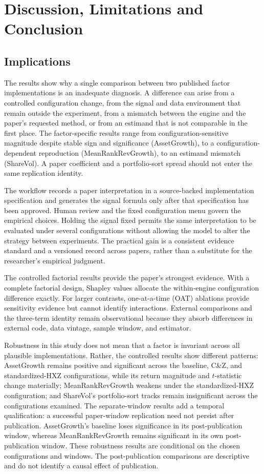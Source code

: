 \section{Discussion, Limitations and Conclusion}
\label{sec:discussion}

\subsection{Implications}

The results show why a single comparison between two published factor
implementations is an inadequate diagnosis. A difference can arise from a
controlled configuration change, from the signal and data environment that
remain outside the experiment, from a mismatch between the engine and the
paper's requested method, or from an estimand that is not comparable in the
first place. The factor-specific results range from configuration-sensitive
magnitude despite stable sign and significance (AssetGrowth), to a
configuration-dependent reproduction (MeanRankRevGrowth), to an estimand
mismatch (ShareVol). A paper coefficient and a portfolio-sort spread should
not enter the same replication identity.

The workflow records a paper interpretation in a source-backed
implementation specification and generates the signal formula only after that
specification has been approved. Human review and the fixed configuration menu
govern the empirical choices. Holding the signal fixed permits the same
interpretation to be evaluated under several configurations without allowing
the model to alter the strategy between experiments. The practical gain is a
consistent evidence standard and a versioned record across papers, rather than
a substitute for the researcher's empirical judgment.

The controlled factorial results provide the paper's strongest evidence.
With a complete factorial design, Shapley values allocate the within-engine
configuration difference exactly. For larger contrasts, one-at-a-time (OAT)
ablations provide sensitivity evidence but cannot identify interactions.
External comparisons and the three-term identity remain observational because
they absorb differences in external code, data vintage, sample window, and
estimator.

Robustness in this study does not mean that a factor is invariant across all
plausible implementations. Rather, the controlled results show different
patterns: AssetGrowth remains positive and significant across the baseline,
C\&Z, and standardized-HXZ configurations, while its return magnitude and
$t$-statistic change materially; MeanRankRevGrowth weakens under the
standardized-HXZ configuration; and ShareVol's portfolio-sort tracks remain
insignificant across the configurations examined. The separate-window results
add a temporal qualification: a successful paper-window replication need not
persist after publication. AssetGrowth's baseline loses significance in its
post-publication window, whereas MeanRankRevGrowth remains significant in its
own post-publication window. These robustness results are conditional on the
chosen configurations and windows. The post-publication comparisons are
descriptive and do not identify a causal effect of publication.

